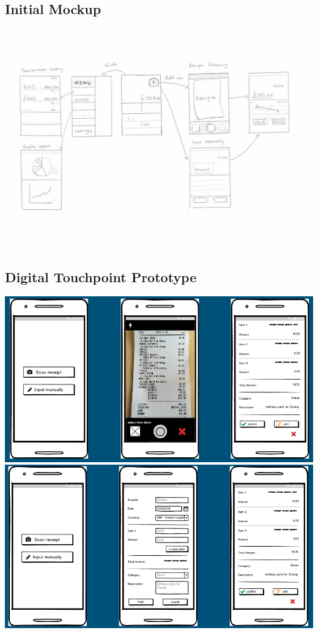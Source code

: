 \documentclass[a4wide, 11pt]{article}
\begin{document}
\subsection{Initial Mockup}
\label{mockup}
\includegraphics[width=\textwidth]{initialMockup.jpg}

\subsection{Digital Touchpoint Prototype}
\label{dtp}
\includegraphics[width=\textwidth]{DTP1.png}
\includegraphics[width=\textwidth]{DTP2.png}
\end{document}
